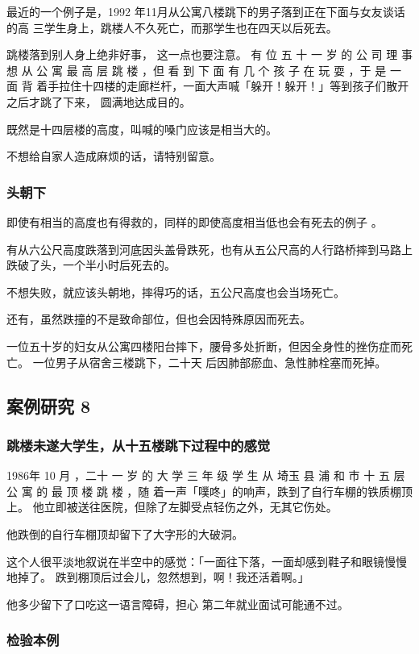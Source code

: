 \documentclass[UTF8]{ctexart}
\begin{document}
最近的一个例子是，1992 年11月从公寓八楼跳下的男子落到正在下面与女友谈话的高 三学生身上，跳楼人不久死亡，而那学生也在四天以后死去。

跳楼落到别人身上绝非好事， 这一点也要注意。 有 位 五 十 一 岁 的 公 司 理 事 想 从 公 寓 最 高 层 跳 楼 ，但 看 到 下 面 有 几 个 孩 子 在 玩 耍 ，于 是 一 面 背 着手拉住十四楼的走廊栏杆，一面大声喊「躲开！躲开！」等到孩子们散开之后才跳了下来， 圆满地达成目的。

既然是十四层楼的高度，叫喊的嗓门应该是相当大的。

不想给自家人造成麻烦的话，请特别留意。 

\subsubsection*{头朝下}

即使有相当的高度也有得救的，同样的即使高度相当低也会有死去的例子 。

有从六公尺高度跌落到河底因头盖骨跌死，也有从五公尺高的人行路桥摔到马路上跌破了头，一个半小时后死去的。

不想失败，就应该头朝地，摔得巧的话，五公尺高度也会当场死亡。

还有，虽然跌撞的不是致命部位，但也会因特殊原因而死去。

一位五十岁的妇女从公寓四楼阳台摔下，腰骨多处折断，但因全身性的挫伤症而死亡。
一位男子从宿舍三楼跳下，二十天 后因肺部瘀血、急性肺栓塞而死掉。

\subsection{案例研究 8}
\subsubsection*{跳楼未遂大学生，从十五楼跳下过程中的感觉}

1986年 10 月 ，二十 一 岁 的 大 学 三 年 级 学 生 从 埼玉 县 浦 和 市 十 五 层 公 寓 的 最 顶 楼 跳 楼 ，随 着一声「噗咚」的响声，跌到了自行车棚的铁质棚顶上。
他立即被送往医院，但除了左脚受点轻伤之外，无其它伤处。

他跌倒的自行车棚顶却留下了大字形的大破洞。

这个人很平淡地叙说在半空中的感觉：「一面往下落，一面却感到鞋子和眼镜慢慢地掉了。
跌到棚顶后过会儿，忽然想到，啊！我还活着啊。」

他多少留下了口吃这一语言障碍，担心 第二年就业面试可能通不过。 

\subsubsection*{检验本例}
\end{document}
